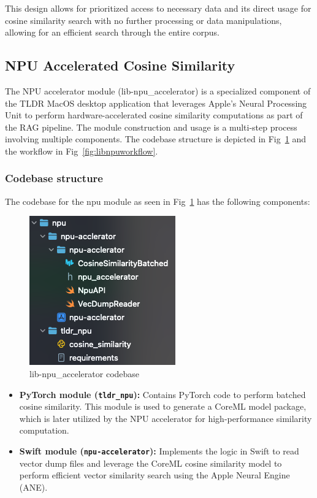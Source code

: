 This design allows for prioritized access to necessary data and its direct usage for cosine similarity search with no further processing or data manipulations, allowing for an efficient search through the entire corpus.

\subsection{NPU Accelerated Cosine Similarity}
\label{subsec:AppDesignModules-NpuCosineSim}
The NPU accelerator module (lib-npu\_accelerator) is a specialized component of the TLDR MacOS desktop application that leverages Apple's Neural Processing Unit to perform hardware-accelerated cosine similarity computations as part of the RAG pipeline.
The module construction and usage is a multi-step process involving multiple components. The codebase structure is depicted in Fig~\ref{fig:libnpucodebase} and the workflow in Fig~\ref{fig:libnpuworkflow}.

\subsubsection{Codebase structure}
The codebase for the npu module as seen in Fig~\ref{fig:libnpucodebase} has the following components:
\begin{figure}[h]
    \centering
    \includegraphics[width=0.4\linewidth]{images/npu-fs.png}
    \caption{lib-npu\_accelerator codebase}
    \label{fig:libnpucodebase}
\end{figure}
\begin{itemize}
    \item \textbf{PyTorch module (\texttt{tldr\_npu}):} Contains PyTorch code to perform batched cosine similarity. This module is used to generate a CoreML model package, which is later utilized by the NPU accelerator for high-performance similarity computation.
    \item \textbf{Swift module (\texttt{npu-accelerator}):} Implements the logic in Swift to read vector dump files and leverage the CoreML cosine similarity model to perform efficient vector similarity search using the Apple Neural Engine (ANE).
\end{itemize}

